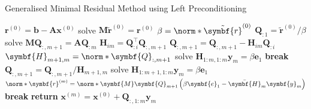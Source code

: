 \documentclass{article}
\begin{document}
\begin{algorithm}[H]
    \caption{Generalised Minimal Residual Method using Left Preconditioning}
    \begin{algorithmic}
        \State \(\symbf{r}^{\left( 0 \right)} = \symbf{b} - \symbf{A} \symbf{x}^{\left( 0 \right)}\)
        \State solve \(\symbf{M} \tilde{\symbf{r}}^{\left( 0 \right)} = \symbf{r}^{\left( 0 \right)}\) 
        \State \(\beta = \norm*{\tilde{\symbf{r}}^{\left( 0 \right)}}\)
        \State \(\symbf{Q}_{:1} = \tilde{\symbf{r}}^{\left( 0 \right)}/\beta\)
        \State solve \(\symbf{M} \symbf{Q}_{:,m+1} = \symbf{A} \symbf{Q}_{:m}\) 
        \State \(\symbf{H}_{im} = \symbf{Q}_{:i}^\top \symbf{Q}_{:,m + 1}\)
        \State \(\symbf{Q}_{:,m+1} = \symbf{Q}_{:,m+1} - \symbf{H}_{im} \symbf{Q}_{:i}\)
        \EndFor
        \State \(\symbf{H}_{m+1,m} = \norm*{\symbf{Q}_{:,m+1}}\)
        \Statex
        \State solve \(\symbf{H}_{1:m,1:m} \symbf{y}_m = \beta \symbf{e}_1\)
        \State \textbf{break}
        \EndIf
        \State \(\symbf{Q}_{:,m+1} = \symbf{Q}_{:,m+1} / \symbf{H}_{m+1,m}\)
        \Statex
        \State solve \(\symbf{H}_{1:m+1,1:m} \symbf{y}_m = \beta \symbf{e}_1\)
        \State \(\norm*{\symbf{r}^{\left( m \right)}} = \norm*{\symbf{M} \symbf{Q}_{m+1} \left( \beta \symbf{e}_1 - \bar{\symbf{H}}_m \symbf{y}_m \right)}\) 
        \State \textbf{break}
        \EndIf
        \EndFor
        \State \textbf{return} \(\symbf{x}^{\left( m \right)} = \symbf{x}^{\left( 0 \right)} + \symbf{Q}_{:,1:m} \symbf{y}_m\)
    \end{algorithmic}
\end{algorithm}
\end{document}
